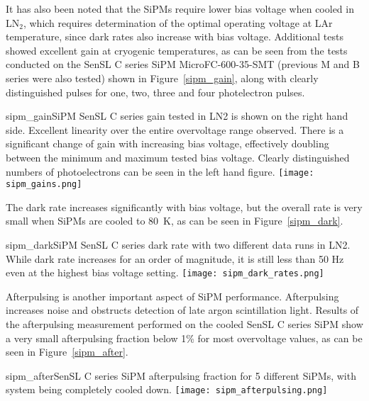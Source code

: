It has also been noted that the SiPMs require lower bias voltage when
cooled in LN$_2$, which requires determination of the optimal operating
voltage at LAr temperature, since dark rates also increase with bias
voltage. Additional tests showed excellent gain at cryogenic
temperatures, as can be seen from the tests conducted on the SenSL C
series SiPM MicroFC-600-35-SMT (previous M and B series were also tested)
shown in Figure~\ref{sipm_gain}, along with clearly distinguished pulses
for one, two, three and four photelectron pulses.

\begin{cdrfigure}{sipm_gain}{SiPM SenSL C series gain tested in LN2 is
    shown on the right hand side. Excellent linearity over the entire
    overvoltage range observed. There is a significant change of gain
    with increasing bias voltage, effectively doubling between the
    minimum and maximum tested bias voltage. Clearly distinguished
    numbers of photoelectrons can be seen in the left hand figure.}    
  \texttt{[image: sipm\_gains.png]}
\end{cdrfigure}

The dark rate increases significantly with bias voltage, but the
overall rate is very small when SiPMs are cooled to 80~K, as can
be seen in Figure~\ref{sipm_dark}.

\begin{cdrfigure}{sipm_dark}{SiPM SenSL C series dark rate with
    two different data runs in LN2. While dark rate increases for an
    order of magnitude, it is still less than 50 Hz even at the
    highest bias voltage setting.}     
  \texttt{[image: sipm\_dark\_rates.png]}
\end{cdrfigure}

Afterpulsing is another important aspect of SiPM
performance. Afterpulsing increases noise and obstructs detection of
late argon scintillation light. Results of the afterpulsing
measurement performed on the cooled SenSL C series SiPM show a
very small afterpulsing fraction below 1\% for most overvoltage
values, as can be seen in Figure~\ref{sipm_after}.

\begin{cdrfigure}{sipm_after}{SenSL C series SiPM afterpulsing fraction for 5
    different SiPMs, with system being completely cooled down.}      
  \texttt{[image: sipm\_afterpulsing.png]}
\end{cdrfigure}

